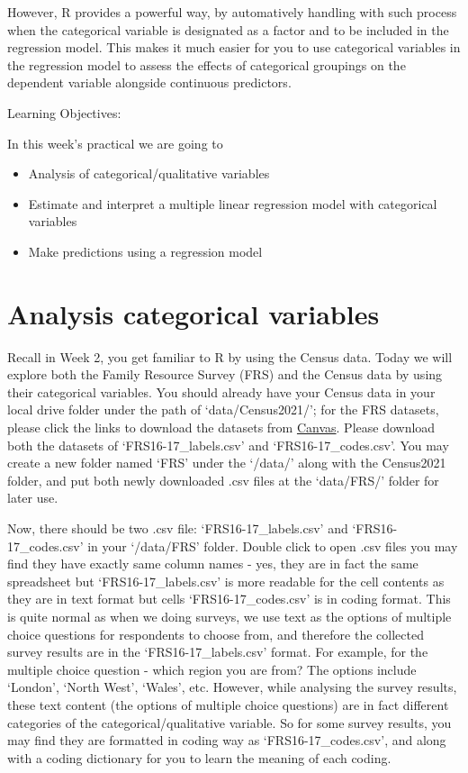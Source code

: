 \documentclass[
  letterpaper,
  DIV=11,
  numbers=noendperiod]{scrreprt}
\begin{document}
However, R provides a powerful way, by automatively handling with such
process when the categorical variable is designated as a factor and to
be included in the regression model. This makes it much easier for you
to use categorical variables in the regression model to assess the
effects of categorical groupings on the dependent variable alongside
continuous predictors.

Learning Objectives:

In this week's practical we are going to

\begin{itemize}
\item
  Analysis of categorical/qualitative variables
\item
  Estimate and interpret a multiple linear regression model with
  categorical variables
\item
  Make predictions using a regression model
\end{itemize}

\section{Analysis categorical
variables}\label{analysis-categorical-variables}

Recall in Week 2, you get familiar to R by using the Census data. Today
we will explore both the Family Resource Survey (FRS) and the Census
data by using their categorical variables. You should already have your
Census data in your local drive folder under the path of
`data/Census2021/'; for the FRS datasets, please click the links to
download the datasets from
\href{https://canvas.liverpool.ac.uk/courses/84668/pages/family-resource-survey-2016-17?module_item_id=2396198}{Canvas}.
Please download both the datasets of `FRS16-17\_labels.csv' and
`FRS16-17\_codes.csv'. You may create a new folder named `FRS' under the
`/data/' along with the Census2021 folder, and put both newly downloaded
.csv files at the `data/FRS/' folder for later use.

Now, there should be two .csv file: `FRS16-17\_labels.csv' and
`FRS16-17\_codes.csv' in your `/data/FRS' folder. Double click to open
.csv files you may find they have exactly same column names - yes, they
are in fact the same spreadsheet but `FRS16-17\_labels.csv' is more
readable for the cell contents as they are in text format but cells
`FRS16-17\_codes.csv' is in coding format. This is quite normal as when
we doing surveys, we use text as the options of multiple choice
questions for respondents to choose from, and therefore the collected
survey results are in the `FRS16-17\_labels.csv' format. For example,
for the multiple choice question - which region you are from? The
options include `London', `North West', `Wales', etc. However, while
analysing the survey results, these text content (the options of
multiple choice questions) are in fact different categories of the
categorical/qualitative variable. So for some survey results, you may
find they are formatted in coding way as `FRS16-17\_codes.csv', and
along with a coding dictionary for you to learn the meaning of each
coding.
\end{document}
